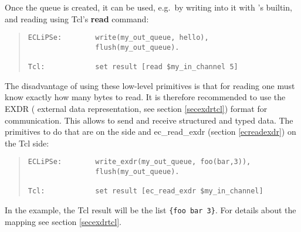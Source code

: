 Once the queue is created, it
can be used, e.g.\ by writing into it with {\eclipse}'s
 builtin,
and reading using Tcl's {\bf read} command:
\begin{quote}\begin{verbatim}
ECLiPSe:        write(my_out_queue, hello),
                flush(my_out_queue).

Tcl:            set result [read $my_in_channel 5]
\end{verbatim}\end{quote}
The disadvantage of using these low-level primitives is that
for reading one must know exactly how many bytes to read.
It is therefore recommended to use the EXDR ({\eclipse} external data
representation, see section \ref{secexdrtcl}) format for communication.
This allows to send and receive structured and typed data.
The primitives to do that are
on the {\eclipse} side and
ec_read_exdr (section \ref{ecreadexdr}) on the Tcl side:
\begin{quote}\begin{verbatim}
ECLiPSe:        write_exdr(my_out_queue, foo(bar,3)),
                flush(my_out_queue).
	        
Tcl:            set result [ec_read_exdr $my_in_channel]
\end{verbatim}\end{quote}
In the example, the Tcl result will be the list {\tt \{foo bar 3\}}.
For details about the mapping see section \ref{secexdrtcl}.

